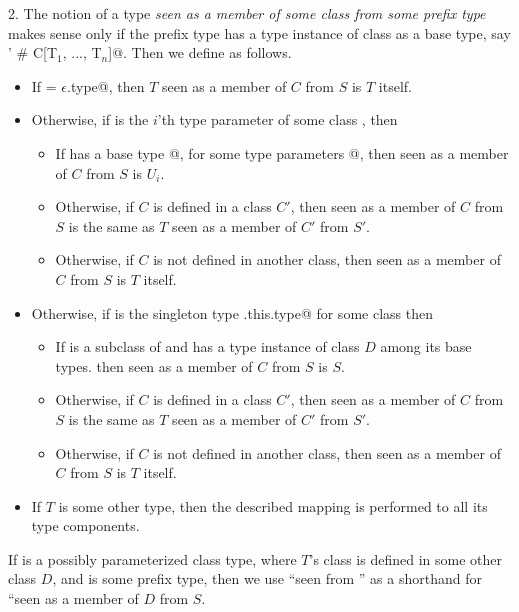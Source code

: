 \documentclass[11pt]{report}
\begin{document}
2. The notion of a type \verb@T@
{\em seen as a member of some class \verb@C@ from some prefix type
\verb@S@} makes sense only if the prefix type \verb@S@
has a type instance of class \verb@C@ as a base type, say
\verb@S' # C[T$_1$, ..., T$_n$]@. Then we define as follows.
\begin{itemize}
 \item 
  If \verb@S = $\epsilon$.type@, then $T$ seen as a member of $C$ from $S$ is $T$ itself.
 \item Otherwise, if \verb@T@ is the $i$'th type parameter of some class \verb@D@, then
   \begin{itemize}
   \item
   If \verb@S@ has a base type \verb@D[U$_1$, ..., U$_n$]@, for some type parameters
   \verb@[U$_1$, ..., U$_n$]@, then \verb@T@ seen as a member of $C$ from $S$ is $U_i$.
   \item
   Otherwise, if $C$ is defined in a class $C'$, then
   \verb@T@ seen as a member of $C$ from $S$ is the same as $T$ seen as
   a member of $C'$ from $S'$.
   \item
   Otherwise, if $C$ is not defined in another class, then  
   \verb@T@ seen as a member of $C$ from $S$ is $T$ itself.
  \end{itemize}
\item
   Otherwise, 
   if \verb@T@ is the singleton type \verb@D.this.type@ for some class \verb@D@
   then
   \begin{itemize}
   \item
   If \verb@D@ is a subclass of \verb@C@ and 
   \verb@S@ has a type instance of class $D$ among its base types.
   then \verb@T@ seen as a member of $C$ from $S$ is $S$.
   \item
   Otherwise, if $C$ is defined in a class $C'$, then
   \verb@T@ seen as a member of $C$ from $S$ is the same as $T$ seen as
   a member of $C'$ from $S'$.
   \item
   Otherwise, if $C$ is not defined in another class, then  
   \verb@T@ seen as a member of $C$ from $S$ is $T$ itself.
   \end{itemize}
\item
  If $T$ is some other type, then the described mapping is performed
  to all its type components.
\end{itemize}

If \verb@T@ is a possibly parameterized class type, where $T$'s class
is defined in some other class $D$, and \verb@S@ is some prefix type,
then we use ``\verb@T@ seen from \verb@S@'' as a shorthand for
``\verb@T@ seen as a member of $D$ from $S$.
\end{document}
